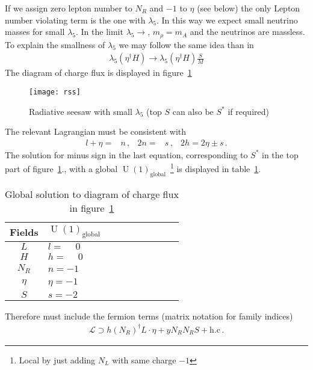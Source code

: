 If we assign zero lepton number to $N_R$ and $-1$ to $\eta$ (see below) the only Lepton number violating term is the one with $\lambda_5$. In this way we expect small neutrino masses for small $\lambda_5$. In the limit $\lambda_5\to $, $m_{\rho}=m_A$ and the neutrinos are massless.
To explain the smallness of $\lambda_5$ we may follow the same idea than in~\cite{Suematsu:2017kcu}
\begin{align}
  \lambda_5 \left( \eta^{\dagger}H \right) \to    \lambda_5 \left( \eta^{\dagger}H \right) \frac{S}{M}
\end{align}
The diagram of charge flux is displayed in figure~\ref{fig:rss}
\begin{figure}
  \centering
  \texttt{[image: rss]}
  \caption{Radiative seesaw with small $\lambda_5$ (top $S$ can also be $S^{*}$ if required)}
  \label{fig:rss}
\end{figure}

The relevant Lagrangian must be consistent with
\begin{align}
  l+\eta=&n\,,& 2n=&s\,, & 2h=2\eta\pm s\,.
\end{align}
The solution for minus sign in the last equation, corresponding to $S^*$ in the top part of figure~\ref{fig:rss}.,  with a global $\operatorname{U}(1)_{\text{global}}$~\cite{Suematsu:2017kcu}\footnote{Local by just adding $N_L$ with same charge $-1$} is displayed in table~\ref{tab:suematsu}.

\begin{table}
  \centering
  \begin{tabular}{c|ll}
    Fields&$\operatorname{U}(1)_{\text{global}}$& $\phantom{\operatorname{U}(1)_X}$\\ \hline
    $L$   & $l=\phantom{-}0$&$\phantom{l=-1}$\\
    $H$   & $h=\phantom{-}0$&$\phantom{h=-1-l=0}$\\
    $N_R$ & $n=-1$          &$\phantom{n=-1/2}$\\
    $\eta$& $\eta=-1$       &$\phantom{-1/2-l=1/2}$ \\
    $S$   & $s=-2$         &$\phantom{s=-1}$ \\
  \end{tabular}
  \caption{Global solution  to diagram of charge flux in figure~\ref{fig:rss}}
  \label{tab:suematsu}
\end{table}

Therefore must include the fermion terms (matrix notation for family indices)
\begin{align}
  \mathcal{L}\supset h \left( N_R \right)^{\dagger} L \cdot \eta + y N_R N_R S + \text{h.c}\,.
\end{align}


